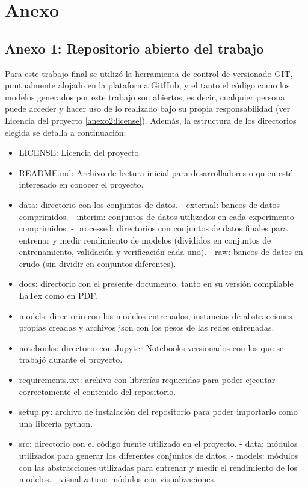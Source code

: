 \section{Anexo}\label{sec:anexo}

\subsection{Anexo 1: Repositorio abierto del trabajo}\label{anexo1:repo}
Para este trabajo final se utilizó la herramienta de control de versionado GIT, puntualmente alojado en la plataforma GitHub, y el tanto el código como los modelos generados por este trabajo son abiertos, es decir, cualquier persona puede acceder y hacer uso de lo realizado bajo su propia responsabilidad (ver Licencia del proyecto \ref{anexo2:license}). Además, la estructura de los directorios elegida se detalla a continuación:
\begin{itemize}
	\item LICENSE: Licencia del proyecto.
	\item README.md: Archivo de lectura inicial para desarrolladores o quien esté interesado en conocer el proyecto.
	\item data: directorio con los conjuntos de datos.
		\subitem - external: bancos de datos comprimidos.
		\subitem - interim: conjuntos de datos utilizados en cada experimento comprimidos.
		\subitem - processed: directorios con conjuntos de datos finales para entrenar y medir rendimiento de modelos (divididos en conjuntos de entrenamiento, validación y verificación cada uno).
		\subitem - raw: bancos de datos en crudo (sin dividir en conjuntos diferentes).
	\item docs: directorio con el presente documento, tanto en su versión compilable LaTex como en PDF.
	\item models: directorio con los modelos entrenados, instancias de abstracciones propias creadas y archivos json con los pesos de las redes entrenadas.
	\item notebooks: directorio con Jupyter Notebooks versionados con los que se trabajó durante el proyecto.
	\item requirements.txt: archivo con librerías requeridas para poder ejecutar correctamente el contenido del repositorio.
	\item setup.py: archivo de instalación del repositorio para poder importarlo como una librería python.
	\item src: directorio con el código fuente utilizado en el proyecto.
		\subitem - data: módulos utilizados para generar los diferentes conjuntos de datos.
		\subitem - models: módulos con las abstracciones utilizadas para entrenar y medir el rendimiento de los modelos.
		\subitem - visualization: módulos con visualizaciones.
\end{itemize}

